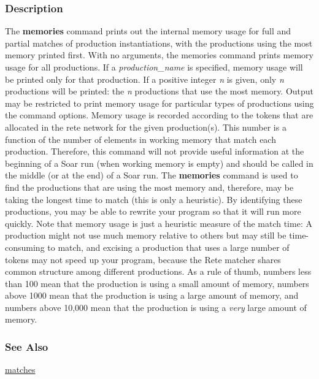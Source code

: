 \subsubsection*{Description}
 The \textbf{memories}
 command prints out the internal memory usage for full and partial matches of production instantiations, with the productions using the most memory printed first. With no arguments, the memories command prints memory usage for all productions. If a \emph{production\_name}
 is specified, memory usage will be printed only for that production. If a positive integer \emph{n}
 is given, only \emph{n}
 productions will be printed: the \emph{n}
 productions that use the most memory. Output may be restricted to print memory usage for particular types of productions using the command options. 
 Memory usage is recorded according to the tokens that are allocated in the rete network for the given production(s). This number is a function of the number of elements in working memory that match each production. Therefore, this command will not provide useful information at the beginning of a Soar run (when working memory is empty) and should be called in the middle (or at the end) of a Soar run. 
 The \textbf{memories}
 command is used to find the productions that are using the most memory and, therefore, may be taking the longest time to match (this is only a heuristic). By identifying these productions, you may be able to rewrite your program so that it will run more quickly. Note that memory usage is just a heuristic measure of the match time: A production might not use much memory relative to others but may still be time-consuming to match, and excising a production that uses a large number of tokens may not speed up your program, because the Rete matcher shares common structure among different productions. 
 As a rule of thumb, numbers less than 100 mean that the production is using a small amount of memory, numbers above 1000 mean that the production is using a large amount of memory, and numbers above 10,000 mean that the production is using a \emph{very}
 large amount of memory. 
\subsubsection*{See Also}
\hyperref[matches]{matches} 